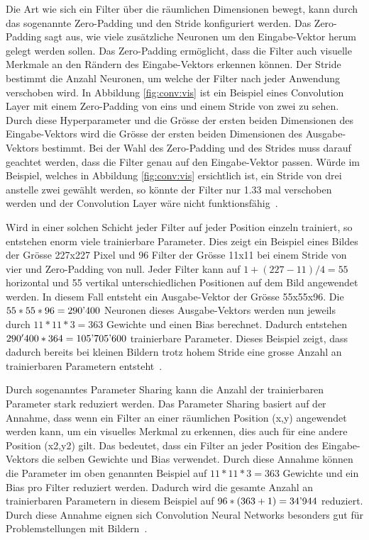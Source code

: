 Die Art wie sich ein Filter über die räumlichen Dimensionen bewegt, kann durch das sogenannte Zero-Padding und den Stride konfiguriert werden. Das Zero-Padding sagt aus, wie viele zusätzliche Neuronen um den Eingabe-Vektor herum gelegt werden sollen. Das Zero-Padding ermöglicht, dass die Filter auch visuelle Merkmale an den Rändern des Eingabe-Vektors erkennen können. Der Stride bestimmt die Anzahl Neuronen, um welche der Filter nach jeder Anwendung verschoben wird. In Abbildung \ref{fig:conv:vis} ist ein Beispiel eines Convolution Layer mit einem Zero-Padding von eins und einem Stride von zwei zu sehen. Durch diese Hyperparameter und die Grösse der ersten beiden Dimensionen des Eingabe-Vektors wird die Grösse der ersten beiden Dimensionen des Ausgabe-Vektors bestimmt. Bei der Wahl des Zero-Padding und des Strides muss darauf geachtet werden, dass die Filter genau auf den Eingabe-Vektor passen. Würde im Beispiel, welches in Abbildung \ref{fig:conv:vis} ersichtlich ist, ein Stride von drei anstelle zwei gewählt werden, so könnte der Filter nur 1.33 mal verschoben werden und der Convolution Layer wäre nicht funktionsfähig~\autocite{CNN}.

Wird in einer solchen Schicht jeder Filter auf jeder Position einzeln trainiert, so entstehen enorm viele trainierbare Parameter. Dies zeigt ein Beispiel eines Bildes der Grösse 227x227 Pixel und 96 Filter der Grösse 11x11 bei einem Stride von vier und Zero-Padding von null. Jeder Filter kann auf $1+(227-11)/4 = 55$ horizontal und 55 vertikal unterschiedlichen Positionen auf dem Bild angewendet werden. In diesem Fall entsteht ein Ausgabe-Vektor der Grösse 55x55x96. Die $55*55*96 = 290\textnormal{'}400$ Neuronen dieses Ausgabe-Vektors werden nun jeweils durch $11*11*3 = 363$ Gewichte und einen Bias berechnet. Dadurch entstehen $290'400*364 = 105\textnormal{'}705\textnormal{'}600$ trainierbare Parameter. Dieses Beispiel zeigt, dass dadurch bereits bei kleinen Bildern trotz hohem Stride eine grosse Anzahl an trainierbaren Parametern entsteht~\autocite{CNN}.

Durch sogenanntes Parameter Sharing kann die Anzahl der trainierbaren Parameter stark reduziert werden. Das Parameter Sharing basiert auf der Annahme, dass wenn ein Filter an einer räumlichen Position (x,y) angewendet werden kann, um ein visuelles Merkmal zu erkennen, dies auch für eine andere Position (x2,y2) gilt. Das bedeutet, dass ein Filter an jeder Position des Eingabe-Vektors die selben Gewichte und Bias verwendet. Durch diese Annahme können die Parameter im oben genannten Beispiel auf $11*11*3 = 363$ Gewichte und ein Bias pro Filter reduziert werden. Dadurch wird die gesamte Anzahl an trainierbaren Parametern in diesem Beispiel auf $96*(363+1) = 34\textnormal{'}944$ reduziert. Durch diese Annahme eignen sich Convolution Neural Networks besonders gut für Problemstellungen mit Bildern~\autocite{CNN}. 

